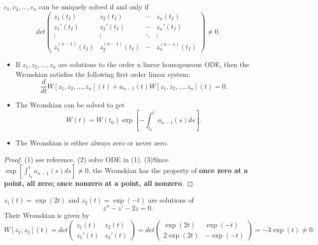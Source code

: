 \begin{refsection}
\begin{note}
$c_1,c_2,...,c_n$ can be uniquely solved if and only if 
$$det \begin{pmatrix}
	z_1(t_I) & z_2(t_I) & \cdots & z_n(t_I)\\ 
	z_1'(t_I) & z_2'(t_I) & \cdots & z_n'(t_I)\\ 
	\vdots & \vdots & \ddots & \vdots\\ 
	z_1^{(n-1)}(t_I) & z_2^{(n-1)}(t_I) & \cdots & z_n^{(n-1)}(t_I)
\end{pmatrix} \neq 0.$$	
\end{note}


\begin{theorem}\label{ch:dynamical-systems:th:AbelWronskianTheoremAndItsProperties}
\cite[32]{sanchez1968ordinary}\hfill
\begin{itemize}
	\item If $z_1,z_2,...,z_n$ are solutions to the order n linear homogeneous ODE, then the Wronskian satisfies the following first order linear system:
	$$\frac{d}{dt}W[z_1,z_2,...,z_n](t) + a_{n-1}(t)W[z_1,z_2,...,z_n](t) = 0.$$
	\item The Wronskian can be solved to get
	$$W(t) = W(t_0)\exp[-\int_{t_0}^t a_{n-1}(s)ds].$$
	\item The Wronskian is either always zero or never zero. 
\end{itemize}
\end{theorem}
\begin{proof}
(1) see reference. (2) solve ODE in (1). (3)Since $\exp[\int_{t_0}^t a_{n-1}(s)ds] \neq 0$, the Wronskian has the property of \textbf{once zero at a point, all zero; once nonzero at a point, all nonzero}.	
\end{proof}

\begin{example}
$z_1(t) = \exp(2t)$ and $z_2(t) = \exp(-t)$ are solutions of 
$$z''-z'-2z = 0.$$
Their Wronskian is given by
$$W[z_1,z_2](t) = det \begin{pmatrix}
z_1(t)& z_2(t) \\
z_1'(t)& z_2'(t)
\end{pmatrix} = det \begin{pmatrix}
\exp(2t)& \exp(-t) \\
2\exp(2t)& -\exp(-t)
\end{pmatrix} = -3\exp(t)\neq 0.$$	
\end{example}


\end{refsection}
